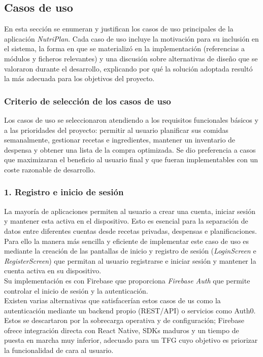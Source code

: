 \documentclass[twoside, openright, 11pt]{report}
\begin{document}
		
		\subsection{Casos de uso}
			\label{sec:casos_de_uso}
			
			En esta sección se enumeran y justifican los casos de uso principales de la aplicación \textit{NutriPlan}. Cada caso de uso incluye la motivación para su inclusión en el sistema, la forma en que se materializó en la implementación (referencias a módulos y ficheros relevantes) y una discusión sobre alternativas de diseño que se valoraron durante el desarrollo, explicando por qué la solución adoptada resultó la más adecuada para los objetivos del proyecto.
		
		\subsubsection*{Criterio de selección de los casos de uso}
			Los casos de uso se seleccionaron atendiendo a los requisitos funcionales básicos y a las prioridades del proyecto: permitir al usuario planificar sus comidas semanalmente, gestionar recetas e ingredientes, mantener un inventario de despensa y obtener una lista de la compra optimizada. Se dio preferencia a casos que maximizaran el beneficio al usuario final y que fueran implementables con un coste razonable de desarrollo.
		
		\subsubsection{1. Registro e inicio de sesión}
			La mayoría de aplicaciones permiten al usuario a crear una cuenta, iniciar sesión y mantener esta activa en el dispositivo. Esto es esencial para la separación de datos entre diferentes cuentas desde recetas privadas, despensas e planificaciones.\\
			Para ello la manera más sencilla y eficiente de implementar este caso de uso es mediante la creación de las pantallas de inicio y registro de sesión (\textit{LoginScreen} e \textit{RegisterScreen}) que permitan al usuario registrarse e iniciar sesión y mantener la cuenta activa en su dispositivo.\\
			Su implementación es con Firebase que proporciona \textit{Firebase Auth} que permite controlar el inicio de sesión y la autenticación.\\
			Existen varias alternativas que satisfacerían estos casos de us como la autenticación mediante un backend propio (REST/API) o servicios como Auth0. Estos se descartaron por la sobrecarga operativa y de configuración; Firebase ofrece integración directa con React Native, SDKs maduros y un tiempo de puesta en marcha muy inferior, adecuado para un TFG cuyo objetivo es priorizar la funcionalidad de cara al usuario.
		
\end{document}
